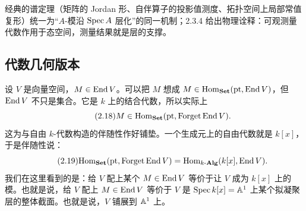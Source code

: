 \begin{sectionkey}
经典的谱定理（矩阵的 Jordan 形、自伴算子的投影值测度、拓扑空间上局部常值复形）统一为“$A$-模沿 $\mathrm{Spec}\,A$ 层化”的同一机制；2.3.4 给出物理诠释：可观测量代数作用于态空间，测量结果就是层的支撑。
\end{sectionkey}

\subsection{代数几何版本}

设 $V$ 是向量空间，$M\in\mathrm{End}\,V$。可以把 $M$ 想成 $M\in\mathrm{Hom}_{\mathbf{Set}}(\mathrm{pt},\mathrm{End}\,V)$，但 $\mathrm{End}\,V$ 不只是集合。它是 $k$ 上的结合代数，所以实际上
\begin{equation}\tag{2.18}
M\in\mathrm{Hom}_{\mathbf{Set}}(\mathrm{pt},\operatorname{Forget}\mathrm{End}\,V).
\end{equation}
这为与自由 $k$-代数构造的伴随性作好铺垫。一个生成元上的自由代数就是 $k[x]$，于是伴随性说：
\begin{equation}\tag{2.19}
\mathrm{Hom}_{\mathbf{Set}}(\mathrm{pt},\operatorname{Forget}\mathrm{End}\,V)
=\mathrm{Hom}_{k\text{-}\mathbf{Alg}}(k[x],\mathrm{End}\,V).
\end{equation}
我们在这里看到的是：给 $V$ 配上某个 $M\in\mathrm{End}\,V$ 等价于让 $V$ 成为 $k[x]$ 上的模。也就是说，给 $V$ 配上 $M\in\mathrm{End}\,V$ 等价于 $V$ 是 $\mathrm{Spec}\,k[x]=\mathbb{A}^1$ 上某个拟凝聚层的整体截面。也就是说，$V$ 铺展到 $\mathbb{A}^1$ 上。

